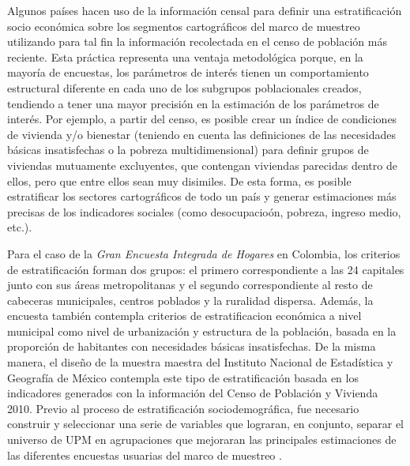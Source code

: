 \documentclass[
  12pt,
  spanish,
]{book}
\begin{document}
Algunos países hacen uso de la información censal para definir una estratificación socio económica sobre los segmentos cartográficos del marco de muestreo utilizando para tal fin la información recolectada en el censo de población más reciente. Esta práctica representa una ventaja metodológica porque, en la mayoría de encuestas, los parámetros de interés tienen un comportamiento estructural diferente en cada uno de los subgrupos poblacionales creados, tendiendo a tener una mayor precisión en la estimación de los parámetros de interés. Por ejemplo, a partir del censo, es posible crear un índice de condiciones de vivienda y/o bienestar (teniendo en cuenta las definiciones de las necesidades básicas insatisfechas o la pobreza multidimensional) para definir grupos de viviendas mutuamente excluyentes, que contengan viviendas parecidas dentro de ellos, pero que entre ellos sean muy disimiles. De esta forma, es posible estratificar los sectores cartográficos de todo un país y generar estimaciones más precisas de los indicadores sociales (como desocupacioón, pobreza, ingreso medio, etc.).

Para el caso de la \emph{Gran Encuesta Integrada de Hogares} en Colombia, los criterios de estratificación forman dos grupos: el primero correspondiente a las 24 capitales junto con sus áreas metropolitanas y el segundo correspondiente al resto de cabeceras municipales, centros poblados y la ruralidad dispersa. Además, la encuesta también contempla criterios de estratificacion económica a nivel municipal como nivel de urbanización y estructura de la población, basada en la proporción de habitantes con necesidades básicas insatisfechas. De la misma manera, el diseño de la muestra maestra del Instituto Nacional de Estadística y Geografía de México contempla este tipo de estratificación basada en los indicadores generados con la información del Censo de Población y Vivienda 2010. Previo al proceso de estratificación sociodemográfica, fue necesario construir y seleccionar una serie de variables que lograran, en conjunto, separar el universo de UPM en agrupaciones que mejoraran las principales estimaciones de las diferentes encuestas usuarias del marco de muestreo \citep{INEGI_MX_2012}.
\end{document}
